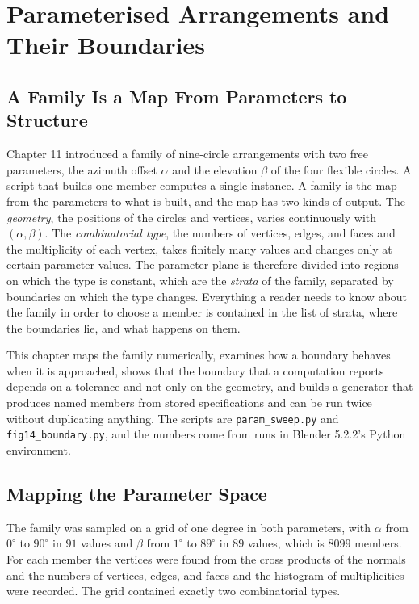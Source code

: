 \chapter{Parameterised Arrangements and Their Boundaries}

\section{A Family Is a Map From Parameters to Structure}

Chapter 11 introduced a family of nine-circle arrangements with two free parameters, the azimuth offset $\alpha$ and the elevation $\beta$ of the four flexible circles. A script that builds one member computes a single instance. A family is the map from the parameters to what is built, and the map has two kinds of output. The \emph{geometry}, the positions of the circles and vertices, varies continuously with $(\alpha,\beta)$. The \emph{combinatorial type}, the numbers of vertices, edges, and faces and the multiplicity of each vertex, takes finitely many values and changes only at certain parameter values. The parameter plane is therefore divided into regions on which the type is constant, which are the \emph{strata} of the family, separated by boundaries on which the type changes. Everything a reader needs to know about the family in order to choose a member is contained in the list of strata, where the boundaries lie, and what happens on them.

This chapter maps the family numerically, examines how a boundary behaves when it is approached, shows that the boundary that a computation reports depends on a tolerance and not only on the geometry, and builds a generator that produces named members from stored specifications and can be run twice without duplicating anything. The scripts are \texttt{param\_sweep.py} and \texttt{fig14\_boundary.py}, and the numbers come from runs in Blender 5.2.2's Python environment.

\section{Mapping the Parameter Space}

The family was sampled on a grid of one degree in both parameters, with $\alpha$ from $0^\circ$ to $90^\circ$ in $91$ values and $\beta$ from $1^\circ$ to $89^\circ$ in $89$ values, which is $8099$ members. For each member the vertices were found from the cross products of the normals and the numbers of vertices, edges, and faces and the histogram of multiplicities were recorded. The grid contained exactly two combinatorial types.

